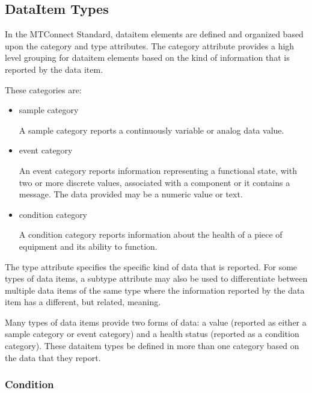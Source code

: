 \subsection{DataItem Types} \label{sec:DataItemTypes}

In the MTConnect Standard, \gls{dataitem} elements are defined and organized based upon the \gls{category} and \gls{type} attributes.  The \gls{category} attribute provides a high level grouping for \gls{dataitem} elements based on the kind of information that is reported by the data item.

These categories are:

\begin{itemize}

\item \gls{sample category}

A \gls{sample category} reports a continuously variable or analog data value. 

\item \gls{event category}

An \gls{event category} reports information representing a functional state, with two or more discrete values, associated with a component or it contains a message.  The data provided may be a numeric value or text.

\item \gls{condition category}

A \gls{condition category} reports information about the health of a piece of equipment and its ability to function.
\end{itemize}

The \gls{type} attribute specifies the specific kind of data that is reported.   For some types of data items, a \gls{subtype} attribute may also be used to differentiate between multiple data items of the same \gls{type} where the information reported by the data item has a different, but related, meaning.

Many types of data items provide two forms of data: a value (reported as either a \gls{sample category} or \gls{event category}) and a health status (reported as a \gls{condition category}).  These \gls{dataitem} types \may be defined in more than one \gls{category} based on the data that they report.



\subsubsection{Condition}
  \label{sec:Condition}


